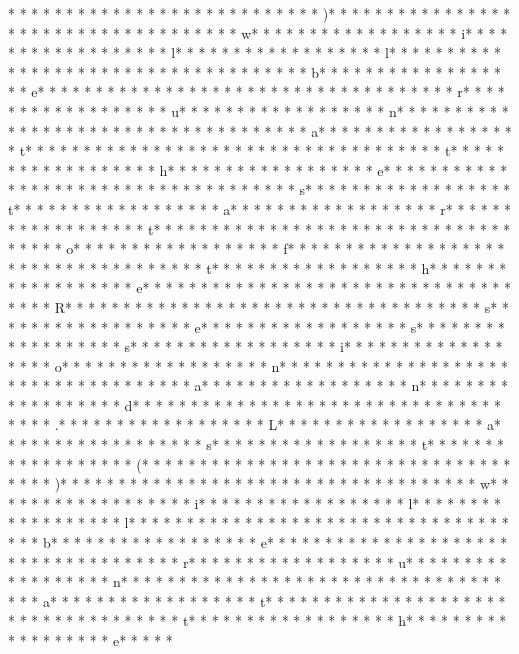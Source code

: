  *  * * *  *  * * *  *  * * *  * * *  * * *  *  * * *  *  * * *  * )* * *  * * *  * * *  *  * * *  *  * * *  *  * * *  * * *  * * *  *  * * *  *  * * *  * w* * *  * * *  * * *  *  * * *  *  * * *  * i* * *  * * *  * * *  *  * * *  *  * * *  * l* * *  * * *  * * *  *  * * *  *  * * *  * l* * *  * * *  * * *  *  * * *  *  * * *  *  * * *  * * *  * * *  *  * * *  *  * * *  * b* * *  * * *  * * *  *  * * *  *  * * *  * e* * *  * * *  * * *  *  * * *  *  * * *  *  * * *  * * *  * * *  *  * * *  *  * * *  * r* * *  * * *  * * *  *  * * *  *  * * *  * u* * *  * * *  * * *  *  * * *  *  * * *  * n* * *  * * *  * * *  *  * * *  *  * * *  *  * * *  * * *  * * *  *  * * *  *  * * *  * a* * *  * * *  * * *  *  * * *  *  * * *  * t* * *  * * *  * * *  *  * * *  *  * * *  *  * * *  * * *  * * *  *  * * *  *  * * *  * t* * *  * * *  * * *  *  * * *  *  * * *  * h* * *  * * *  * * *  *  * * *  *  * * *  * e* * *  * * *  * * *  *  * * *  *  * * *  *  * * *  * * *  * * *  *  * * *  *  * * *  * s* * *  * * *  * * *  *  * * *  *  * * *  * t* * *  * * *  * * *  *  * * *  *  * * *  * a* * *  * * *  * * *  *  * * *  *  * * *  * r* * *  * * *  * * *  *  * * *  *  * * *  * t* * *  * * *  * * *  *  * * *  *  * * *  *  * * *  * * *  * * *  *  * * *  *  * * *  * o* * *  * * *  * * *  *  * * *  *  * * *  * f* * *  * * *  * * *  *  * * *  *  * * *  *  * * *  * * *  * * *  *  * * *  *  * * *  * t* * *  * * *  * * *  *  * * *  *  * * *  * h* * *  * * *  * * *  *  * * *  *  * * *  * e* * *  * * *  * * *  *  * * *  *  * * *  *  * * *  * * *  * * *  *  * * *  *  * * *  * R* * *  * * *  * * *  *  * * *  *  * * *  *  * * *  * * *  * * *  *  * * *  *  * * *  * s* * *  * * *  * * *  *  * * *  *  * * *  * e* * *  * * *  * * *  *  * * *  *  * * *  * s* * *  * * *  * * *  *  * * *  *  * * *  * s* * *  * * *  * * *  *  * * *  *  * * *  * i* * *  * * *  * * *  *  * * *  *  * * *  * o* * *  * * *  * * *  *  * * *  *  * * *  * n* * *  * * *  * * *  *  * * *  *  * * *  *  * * *  * * *  * * *  *  * * *  *  * * *  * a* * *  * * *  * * *  *  * * *  *  * * *  * n* * *  * * *  * * *  *  * * *  *  * * *  * d* * *  * * *  * * *  *  * * *  *  * * *  *  * * *  * * *  * * *  *  * * *  *  * * *  * .* * *  * * *  * * *  *  * * *  *  * * *  * L* * *  * * *  * * *  *  * * *  *  * * *  * a* * *  * * *  * * *  *  * * *  *  * * *  * s* * *  * * *  * * *  *  * * *  *  * * *  * t* * *  * * *  * * *  *  * * *  *  * * *  * (* * *  * * *  * * *  *  * * *  *  * * *  *  * * *  * * *  * * *  *  * * *  *  * * *  * )* * *  * * *  * * *  *  * * *  *  * * *  *  * * *  * * *  * * *  *  * * *  *  * * *  * w* * *  * * *  * * *  *  * * *  *  * * *  * i* * *  * * *  * * *  *  * * *  *  * * *  * l* * *  * * *  * * *  *  * * *  *  * * *  * l* * *  * * *  * * *  *  * * *  *  * * *  *  * * *  * * *  * * *  *  * * *  *  * * *  * b* * *  * * *  * * *  *  * * *  *  * * *  * e* * *  * * *  * * *  *  * * *  *  * * *  *  * * *  * * *  * * *  *  * * *  *  * * *  * r* * *  * * *  * * *  *  * * *  *  * * *  * u* * *  * * *  * * *  *  * * *  *  * * *  * n* * *  * * *  * * *  *  * * *  *  * * *  *  * * *  * * *  * * *  *  * * *  *  * * *  * a* * *  * * *  * * *  *  * * *  *  * * *  * t* * *  * * *  * * *  *  * * *  *  * * *  *  * * *  * * *  * * *  *  * * *  *  * * *  * t* * *  * * *  * * *  *  * * *  *  * * *  * h* * *  * * *  * * *  *  * * *  *  * * *  * e* * *  * * 